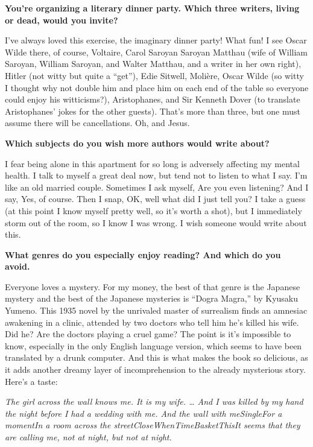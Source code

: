 \textbf{You're organizing a literary dinner party. Which three writers,
living or dead, would you invite?}

I've always loved this exercise, the imaginary dinner party! What fun! I
see Oscar Wilde there, of course, Voltaire, Carol Saroyan Saroyan
Matthau (wife of William Saroyan, William Saroyan, and Walter Matthau,
and a writer in her own right), Hitler (not witty but quite a ``get''),
Edie Sitwell, Molière, Oscar Wilde (so witty I thought why not double
him and place him on each end of the table so everyone could enjoy his
witticisms?), Aristophanes, and Sir Kenneth Dover (to translate
Aristophanes' jokes for the other guests). That's more than three, but
one must assume there will be cancellations. Oh, and Jesus.

\textbf{Which subjects do you wish more authors would write about?}

I fear being alone in this apartment for so long is adversely affecting
my mental health. I talk to myself a great deal now, but tend not to
listen to what I say. I'm like an old married couple. Sometimes I ask
myself, Are you even listening? And I say, Yes, of course. Then I snap,
OK, well what did I just tell you? I take a guess (at this point I know
myself pretty well, so it's worth a shot), but I immediately storm out
of the room, so I know I was wrong. I wish someone would write about
this.

\textbf{What genres do you especially enjoy reading? And which do you
avoid.}

Everyone loves a mystery. For my money, the best of that genre is the
Japanese mystery and the best of the Japanese mysteries is ``Dogra
Magra,'' by Kyusaku Yumeno. This 1935 novel by the unrivaled master of
surrealism finds an amnesiac awakening in a clinic, attended by two
doctors who tell him he's killed his wife. Did he? Are the doctors
playing a cruel game? The point is it's impossible to know, especially
in the only English language version, which seems to have been
translated by a drunk computer. And this is what makes the book so
delicious, as it adds another dreamy layer of incomprehension to the
already mysterious story. Here's a taste:

\emph{The girl across the wall knows me. It is my wife. \ldots{} And I
was killed by my hand the night before I had a wedding with me. And the
wall with meSingleFor a momentIn a room across the
streetCloseWhenTimeBasketThisIt seems that they are calling me, not at
night, but not at night.}

